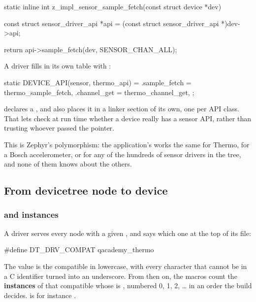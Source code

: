 \begin{ccode}
static inline int z_impl_sensor_sample_fetch(const struct device *dev)
{
	const struct sensor_driver_api *api =
		(const struct sensor_driver_api *)dev->api;

	return api->sample_fetch(dev, SENSOR_CHAN_ALL);
}
\end{ccode}

A driver fills in its own table with :

\begin{ccode}
static DEVICE_API(sensor, thermo_api) = {
	.sample_fetch = thermo_sample_fetch,
	.channel_get = thermo_channel_get,
};
\end{ccode}

\noindent {} declares a , and also
places it in a linker section of its own, one per API class. That lets  check at run time whether a device really has a sensor API, rather than trusting whoever
passed the pointer.

This is Zephyr’s polymorphism: the application’s  works the same for
Thermo, for a Bosch accelerometer, or for any of the hundreds of sensor drivers in the tree, and
none of them knows about the others.

\subsection{From devicetree node to device}

\subsubsection{ and instances}
A driver serves every node with a given , and says which one at the top of its
file:

\begin{ccode}
#define DT_DRV_COMPAT qacademy_thermo
\end{ccode}

\noindent The value is the compatible  in lowercase, with every character
that cannot be in a C identifier turned into an underscore. From then on, the 
macros count the \textbf{instances} of that compatible whose  is , numbered
0, 1, 2, … in an order the build decides.  is
 for instance .


